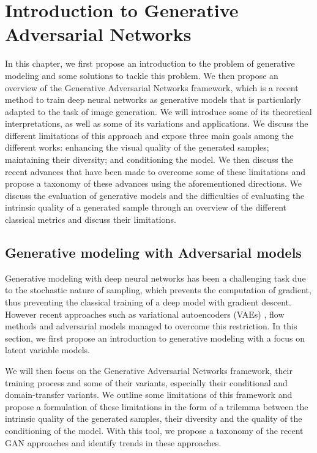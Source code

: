 \chapter{Introduction to Generative Adversarial Networks }
\label{chap:chapter1}

\begin{chapterabstract}
	In this chapter, we first propose an introduction to the problem of generative modeling and some solutions to tackle this problem. We then propose an overview of the Generative Adversarial Networks \citep{Goodfellow2014} framework, which is a recent method to train deep neural networks as generative models that is particularly adapted to the task of image generation. We will introduce some of its theoretical interpretations, as well as some of its variations and applications. We discuss the different limitations of this approach and expose three main goals among the different works: enhancing the visual quality of the generated samples; maintaining their diversity; and conditioning the model. We then discuss the recent advances that have been made to overcome some of these limitations and propose a taxonomy of these advances using the aforementioned directions. We discuss the evaluation of generative models and the difficulties of evaluating the intrinsic quality of a generated sample through an overview of the different classical metrics and discuss their limitations.
\end{chapterabstract}

\minitoc
\newpage

\section{Generative modeling with Adversarial models}
Generative modeling with deep neural networks has been a challenging task due to the stochastic nature of sampling, which prevents the computation of gradient, thus preventing the classical training of a deep model with gradient descent. However recent approaches such as variational autoencoders (\ac{VAE}s) \citep{Kingma2014b}, flow methods \citep{Dinh2017, Kingma2018} and adversarial models \citep{Goodfellow2014} managed to overcome this restriction. In this section, we first propose an introduction to generative modeling with a focus on latent variable models.

We will then focus on the Generative Adversarial Networks \citep{Goodfellow2014} framework, their training process  and some of their variants, especially their conditional and domain-transfer variants. We outline some limitations of this framework and propose a formulation of these limitations in the form of a trilemma between the intrinsic quality of the generated samples, their diversity and the quality of the conditioning of the model. With this tool, we propose a taxonomy of the recent \ac{GAN} approaches and identify trends in these approaches.


